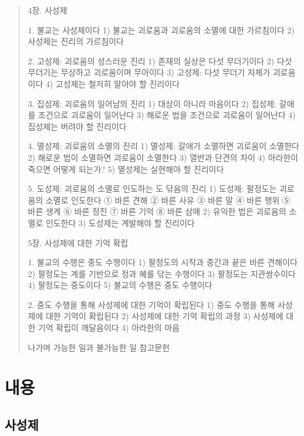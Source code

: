 \documentclass[12pt, a4paper, oneside]{book}
\begin{document}
\begin{quotation}
4장. 사성제

1. 불교는 사성제이다
1) 불교는 괴로움과 괴로움의 소멸에 대한 가르침이다
2) 사성제는 진리의 가르침이다

2. 고성제: 괴로움의 성스러운 진리
1) 존재의 실상은 다섯 무더기이다
2) 다섯 무더기는 무상하고 괴로움이며 무아이다
3) 고성제: 다섯 무더기 자체가 괴로움이다
4) 고성제는 철저히 알아야 할 진리이다

3. 집성제: 괴로움의 일어남의 진리
1) 대상이 아니라 마음이다
2) 집성제: 갈애를 조건으로 괴로움이 일어난다
3) 해로운 법을 조건으로 괴로움이 일어난다
4) 집성제는 버려야 할 진리이다

4. 멸성제: 괴로움의 소멸의 진리
1) 멸성제: 갈애가 소멸하면 괴로움이 소멸한다
2) 해로운 법이 소멸하면 괴로움이 소멸한다
3) 열반과 단견의 차이
4) 아라한이 죽으면 어떻게 되는가?
5) 멸성제는 실현해야 할 진리이다

5. 도성제: 괴로움의 소멸로 인도하는 도 닦음의 진리
1) 도성제: 팔정도는 괴로움의 소멸로 인도한다
① 바른 견해
② 바른 사유
③ 바른 말
④ 바른 행위
⑤ 바른 생계
⑥ 바른 정진
⑦ 바른 기억
⑧ 바른 삼매
2) 유익한 법은 괴로움의 소멸로 인도한다
3) 도성제는 계발해야 할 진리이다

5장. 사성제에 대한 기억 확립

1. 불교의 수행은 중도 수행이다
1) 팔정도의 시작과 중간과 끝은 바른 견해이다
2) 팔정도는 계를 기반으로 정과 혜를 닦는 수행이다
3) 팔정도는 지관쌍수이다
4) 팔정도는 중도이다
5) 불교의 수행은 중도 수행이다

2. 중도 수행을 통해 사성제에 대한 기억이 확립된다
1) 중도 수행을 통해 사성제에 대한 기억이 확립된다
2) 사성제에 대한 기억 확립의 과정
3) 사성제에 대한 기억 확립이 깨달음이다
4) 아라한의 마음

나가며  가능한 일과 불가능한 일
참고문헌

\end{quotation}



\part{내용}


	\newpage
	\chapter{사성제 }


		\newpage
		\minitoc				%
\end{document}
